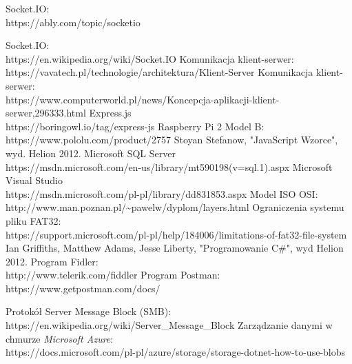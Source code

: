 \begin{thebibliography}{1}
\bibitem Socket.IO:
\\
 https://ably.com/topic/socketio

\bibitem Socket.IO:
\\
 https://en.wikipedia.org/wiki/Socket.IO
\bibitem Komunikacja klient-serwer:
\\
 https://vavatech.pl/technologie/architektura/Klient-Server
\bibitem Komunikacja klient-serwer:
\\
https://www.computerworld.pl/news/Koncepcja-aplikacji-klient-serwer,296333.html
\bibitem Express.js
\\ 
https://boringowl.io/tag/express-js
\bibitem Raspberry Pi 2 Model B:
\\
https://www.pololu.com/product/2757
 Stoyan Stefanow, "JavaScript Wzorce", wyd. Helion 2012.
 Microsoft SQL Server
\\
https://msdn.microsoft.com/en-us/library/mt590198(v=sql.1).aspx
 Microsoft Visual Studio
\\
https://msdn.microsoft.com/pl-pl/library/dd831853.aspx
Model ISO OSI:
\\
http://www.man.poznan.pl/\textasciitilde pawelw/dyplom/layers.html
Ograniczenia systemu pliku FAT32:
\\ https://support.microsoft.com/pl-pl/help/184006/limitations-of-fat32-file-system
 Ian Griffiths, Matthew Adams, Jesse Liberty, "Programowanie C\#", wyd Helion 2012.
Program Fidler:
\\
http://www.telerik.com/fiddler
Program Postman:
\\
https://www.getpostman.com/docs/

Protokół Server Message Block (SMB):
\\
https://en.wikipedia.org/wiki/Server\_Message\_Block
Zarządzanie danymi w chmurze \textit{Microsoft Azure}:
\\
https://docs.microsoft.com/pl-pl/azure/storage/storage-dotnet-how-to-use-blobs
\end{thebibliography}